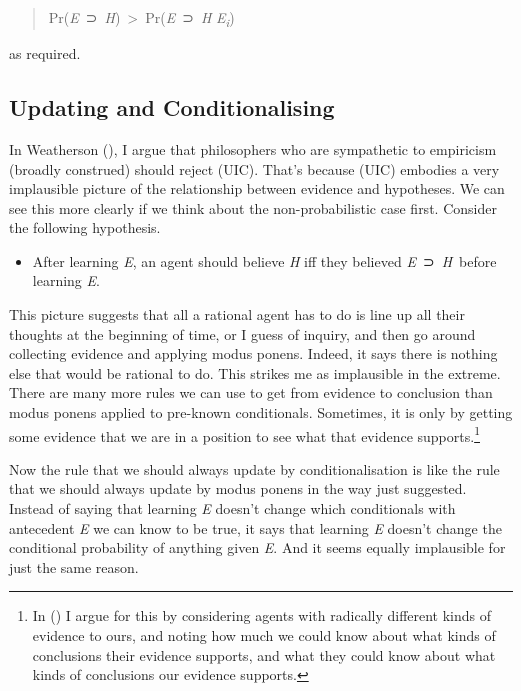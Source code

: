\documentclass[
  11pt,
  letterpaper,
  DIV=11,
  numbers=noendperiod,
  twoside]{scrartcl}
\providecommand{\tightlist}{%
  \setlength{\itemsep}{0pt}\setlength{\parskip}{0pt}}
\begin{document}
\begin{quote}
Pr(\emph{E}~⊃~\emph{H})~\textgreater~Pr(\emph{E}~⊃~\emph{H}\textbar{}
\emph{E\textsubscript{i}})
\end{quote}

as required.

\subsection{Updating and
Conditionalising}\label{updating-and-conditionalising}

In Weatherson (), I argue that
philosophers who are sympathetic to empiricism (broadly construed)
should reject (UIC). That's because (UIC) embodies a very implausible
picture of the relationship between evidence and hypotheses. We can see
this more clearly if we think about the non-probabilistic case first.
Consider the following hypothesis.

\begin{itemize}
\tightlist
\item
  After learning \emph{E}, an agent should believe \emph{H} iff they
  believed \emph{E}~⊃~\emph{H}~before learning \emph{E}.
\end{itemize}

This picture suggests that all a rational agent has to do is line up all
their thoughts at the beginning of time, or I guess of inquiry, and then
go around collecting evidence and applying modus ponens. Indeed, it says
there is nothing else that would be rational to do. This strikes me as
implausible in the extreme. There are many more rules we can use to get
from evidence to conclusion than modus ponens applied to pre-known
conditionals. Sometimes, it is only by getting some evidence that we are
in a position to see what that evidence supports.\footnote{In
  () I argue for this by
  considering agents with radically different kinds of evidence to ours,
  and noting how much we could know about what kinds of conclusions
  their evidence supports, and what they could know about what kinds of
  conclusions our evidence supports.}

Now the rule that we should always update by conditionalisation is like
the rule that we should always update by modus ponens in the way just
suggested. Instead of saying that learning \emph{E} doesn't change which
conditionals with antecedent \emph{E} we can know to be true, it says
that learning \emph{E} doesn't change the conditional probability of
anything given \emph{E}. And it seems equally implausible for just the
same reason.
\end{document}
